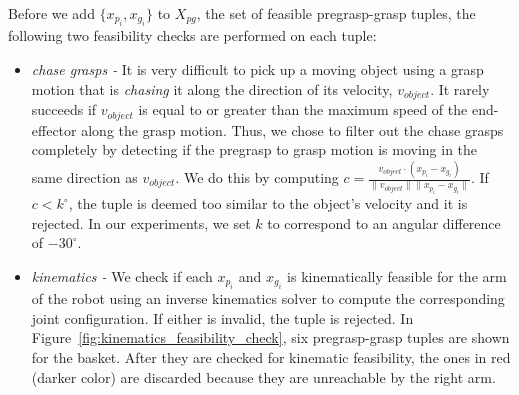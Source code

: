 \documentclass[letterpaper, 10 pt, conference]{ieeeconf}  %
\begin{document}
Before we add $\{x_{p_i}, x_{g_i}\}$ to $X_{pg}$, the set of feasible
pregrasp-grasp tuples, the following two feasibility checks are
performed on each tuple:
\begin{itemize}
\item \textit{chase grasps -} It is very difficult to pick up a moving
  object using a grasp motion that is \textit{chasing} it along the
  direction of its velocity, $v_{object}$.  It rarely succeeds if
  $v_{object}$ is equal to or greater than the maximum speed of the
  end-effector along the grasp motion. Thus, we chose to filter out
  the chase grasps completely by detecting if the pregrasp to grasp
  motion is moving in the same direction as $v_{object}$. We do this
  by computing $c = \frac{v_{object} \cdot (x_{p_i} -
    x_{g_i})}{\|v_{object}\|\|x_{p_i} - x_{g_i}\|}$. If $c <
  k^\circ$, the tuple is deemed too similar to the object's velocity
  and it is rejected. In our experiments, we set $k$ to correspond to
  an angular difference of $-30^\circ$.

 
\item \textit{kinematics -} We check if each $x_{p_i}$ and $x_{g_i}$
  is kinematically feasible for the arm of the robot using an inverse
  kinematics solver to compute the corresponding joint
  configuration. If either is invalid, the tuple is rejected. In
  Figure~\ref{fig:kinematics_feasibility_check}, six pregrasp-grasp
  tuples are shown for the basket. After they are checked for
  kinematic feasibility, the ones in red (darker color) are discarded
  because they are unreachable by the right arm.
\end{itemize}
\end{document}

